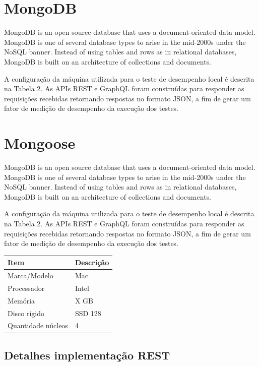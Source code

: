 \section*{MongoDB}

MongoDB is an open source database that uses a document-oriented data model. MongoDB is one of several database types to arise in the mid-2000s under the NoSQL banner. Instead of using tables and rows as in relational databases, MongoDB is built on an architecture of collections and documents.

A configuração da máquina utilizada para o teste de desempenho local é descrita na Tabela 2. As APIs REST e GraphQL foram construídas para responder as requisições recebidas retornando respostas no formato JSON, a fim de gerar um fator de medição de desempenho da execução dos testes.

\section*{Mongoose}

MongoDB is an open source database that uses a document-oriented data model. MongoDB is one of several database types to arise in the mid-2000s under the NoSQL banner. Instead of using tables and rows as in relational databases, MongoDB is built on an architecture of collections and documents.

A configuração da máquina utilizada para o teste de desempenho local é descrita na Tabela 2. As APIs REST e GraphQL foram construídas para responder as requisições recebidas retornando respostas no formato JSON, a fim de gerar um fator de medição de desempenho da execução dos testes.


\begin{center}
\begin{tabular}{| l | l |}
\hline
\textbf{Item} & \textbf{Descrição} \\ \hline
Marca/Modelo & Mac \\ \hline
Processador & Intel \\ \hline
Memória &  X GB  \\ \hline
Disco rígido & SSD 128  \\ \hline
Quantidade núcleos & 4  \\ \hline
\end{tabular}
\end{center}

\subsection{Detalhes implementação REST}

